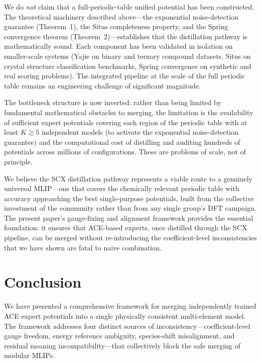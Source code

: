 \documentclass[twoside,prb,aps,floatfix,superscriptaddress,longbibliography]{revtex4-2}
\begin{document}
We do \emph{not} claim that a full-periodic-table unified potential has been constructed. The theoretical machinery described above---the exponential noise-detection guarantee (Theorem~1), the Situs completeness property, and the Spring convergence theorem (Theorem~2)---establishes that the distillation pathway is mathematically sound. Each component has been validated in isolation on smaller-scale systems (Yajie on binary and ternary compound datasets, Situs on crystal structure classification benchmarks, Spring convergence on synthetic and real scoring problems). The integrated pipeline at the scale of the full periodic table remains an engineering challenge of significant magnitude.

The bottleneck structure is now inverted: rather than being limited by fundamental mathematical obstacles to merging, the limitation is the availability of sufficient expert potentials covering each region of the periodic table with at least $K \gtrsim 5$ independent models (to activate the exponential noise-detection guarantee) and the computational cost of distilling and auditing hundreds of potentials across millions of configurations. These are problems of scale, not of principle.

We believe the SCX distillation pathway represents a viable route to a genuinely universal MLIP---one that covers the chemically relevant periodic table with accuracy approaching the best single-purpose potentials, built from the collective investment of the community rather than from any single group's DFT campaign. The present paper's gauge-fixing and alignment framework provides the essential foundation: it ensures that ACE-based experts, once distilled through the SCX pipeline, can be merged without re-introducing the coefficient-level inconsistencies that we have shown are fatal to naive combination.

\section{Conclusion}
\label{sec:conclusion}

We have presented a comprehensive framework for merging independently trained ACE expert potentials into a single physically consistent multi-element model. The framework addresses four distinct sources of inconsistency---coefficient-level gauge freedom, energy reference ambiguity, species-shift misalignment, and residual meaning incompatibility---that collectively block the safe merging of modular MLIPs.
\end{document}
